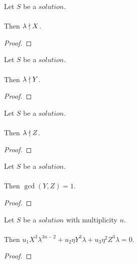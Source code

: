 \begin{lemma}
    \label{lmm:lambda_not_dvd_X}
    \leanok
    Let $S$ be a $solution$.\\\\
    Then $\lambda \nmid X$.
\end{lemma}
\begin{proof}
    \leanok
\end{proof}

\begin{lemma}
    \label{lmm:lambda_not_dvd_Y}
    \leanok
    Let $S$ be a $solution$.\\\\
    Then $\lambda \nmid Y$.
\end{lemma}
\begin{proof}
    \leanok
\end{proof}

\begin{lemma}
    \label{lmm:lambda_not_dvd_Z}
    \leanok
    Let $S$ be a $solution$.\\\\
    Then $\lambda \nmid Z$.
\end{lemma}
\begin{proof}
    \leanok
\end{proof}

\begin{lemma}
    \label{lmm:coprime_Y_Z}
    \leanok
    Let $S$ be a $solution$.\\\\
    Then $\gcd(Y, Z) = 1$.
\end{lemma}
\begin{proof}
    \leanok
\end{proof}

\begin{lemma}
    \label{lmm:formula1}
    \leanok
    Let $S$ be a $solution$ with multiplicity $n$.\\\\
    Then $u_1 X^3 \lambda^{3n-2}+u_2 \eta Y^3 \lambda +
    u_3 \eta^2 Z^3 \lambda = 0$.
\end{lemma}
\begin{proof}
    \leanok
\end{proof}

